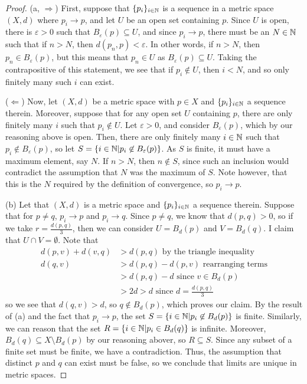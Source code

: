 \documentclass[./main.tex]{subfiles}
\begin{document}
\begin{proof}
    (a, $\Rightarrow$) First, suppose that $\{p_i\}_{i\in\mathbb{N}}$ is a sequence in a metric space $(X,d)$ where $p_i\rightarrow p$, 
    and let $U$ be an open set containing $p$. Since $U$ is open, there is $\varepsilon>0$ such that $B_\varepsilon(p)\subseteq U$, 
    and since $p_i\rightarrow p$, there must be an $N\in \mathbb{N}$ such that if $n>N$, then $d(p_n,p)<\varepsilon$. In other words, if
    $n>N$, then $p_n\in B_\varepsilon(p)$, but this means that $p_n\in U$ as $B_\varepsilon(p)\subseteq U$. Taking the contrapositive 
    of this statement, we see that if $p_i\not\in U$, then $i<N$, and so only finitely many such $i$ can exist.

    ($\Leftarrow$) Now, let $(X,d)$ be a metric space with $p\in X$ and $\{p_i\}_{i\in\mathbb{N}}$ a sequence therein. Moreover, suppose that
    for any open set $U$ containing $p$, there are only finitely many $i$ such that $p_i\not\in U$. Let $\varepsilon>0$, and consider 
    $B_\varepsilon(p)$, which by our reasoning above is open. Then, there are only finitely many $i\in \mathbb{N}$ such that 
    $p_i\not\in B_\varepsilon(p)$, so let $S=\{i\in\mathbb{N} | p_i\not\in B_\varepsilon(p)\}$. As $S$ is finite, it must have a maximum 
    element, say $N$. If $n>N$, then $n\not\in S$, since such an inclusion would contradict the assumption that $N$ was the maximum of 
    $S$. Note however, that this is the $N$ required by the definition of convergence, so $p_i\rightarrow p$.

    (b) Let that $(X,d)$ is a metric space and $\{p_i\}_{i\in\mathbb{N}}$ a sequence therein. Suppose that for $p\neq q$, $p_i\rightarrow p$
    and $p_i\rightarrow q$. Since $p\neq q$, we know that $d(p,q)>0$, so if we take $r=\frac{d(p,q)}{3}$, then we can consider $U=B_d(p)$
    and $V=B_d(q)$. I claim that $U\cap V=\emptyset$. Note that
    \begin{align*}
	d(p,v)+d(v,q) &> d(p,q) \text{ by the triangle inequality}\\
	d(q,v) &> d(p,q) - d(p,v) \text{ rearranging terms}\\
	&> d(p,q) - d \text{ since $v\in B_d(p)$}\\
	&> 2d > d \text{ since $d=\frac{d(p,q)}{3}$}
    \end{align*}
    so we see that $d(q,v) > d$, so $q\not\in B_d(p)$, which proves our claim. By the result of (a) and the fact that $p_i\rightarrow p$,
    the set $S = \{i\in \mathbb{N} | p_i\not\in B_d(p)\}$ is finite. Similarly, we can reason that the set $R =\{i\in\mathbb{N}| p_i\in B_d(q)\}$ is 
    infinite. Moreover, $B_d(q)\subseteq X\setminus B_d(p)$ by our reasoning abover, so $R\subseteq S$. Since any subset of a finite set
    must be finite, we have a contradiction. Thus, the assumption that distinct $p$ and $q$ can exist must be false, so we conclude
    that limits are unique in metric spaces.
\end{proof}
\end{document}
